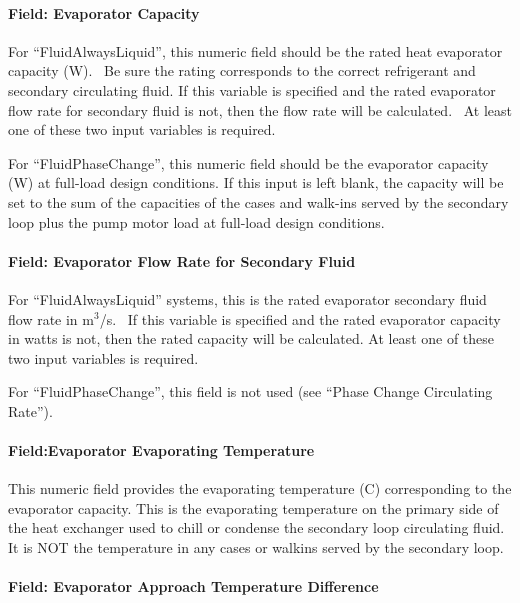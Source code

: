\paragraph{Field: Evaporator Capacity}\label{field-evaporator-capacity}

For ``FluidAlwaysLiquid'', this numeric field should be the rated heat evaporator capacity (W).~ Be sure the rating corresponds to the correct refrigerant and secondary circulating fluid. If this variable is specified and the rated evaporator flow rate for secondary fluid is not, then the flow rate will be calculated.~ At least one of these two input variables is required.

For ``FluidPhaseChange'', this numeric field should be the evaporator capacity (W) at full-load design conditions. If this input is left blank, the capacity will be set to the sum of the capacities of the cases and walk-ins served by the secondary loop plus the pump motor load at full-load design conditions.

\paragraph{Field: Evaporator Flow Rate for Secondary Fluid}\label{field-evaporator-flow-rate-for-secondary-fluid}

For ``FluidAlwaysLiquid'' systems, this is the rated evaporator secondary fluid flow rate in m\(^{3}\)/s.~ If this variable is specified and the rated evaporator capacity in watts is not, then the rated capacity will be calculated. At least one of these two input variables is required.

For ``FluidPhaseChange'', this field is not used (see ``Phase Change Circulating Rate'').

\paragraph{Field:Evaporator Evaporating Temperature}\label{fieldevaporator-evaporating-temperature}

This numeric field provides the evaporating temperature (C) corresponding to the evaporator capacity. This is the evaporating temperature on the primary side of the heat exchanger used to chill or condense the secondary loop circulating fluid.~ It is NOT the temperature in any cases or walkins served by the secondary loop.

\paragraph{Field: Evaporator Approach Temperature Difference}\label{field-evaporator-approach-temperature-difference}

